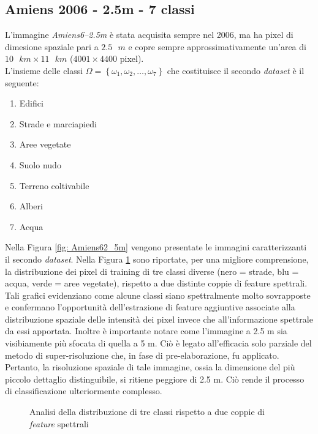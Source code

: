 \clearpage
\subsection{Amiens 2006 - 2.5m - 7 classi}
L'immagine \emph{Amiens6--2.5m} è stata acquisita sempre nel 2006, ma ha pixel di dimesione spaziale pari a $2.5\text{ }m$  e copre sempre approssimativamente un'area di $10\text{ }km\times11\text{ }km$ ($4001\times4400$ pixel).\\
L'insieme delle classi $\Omega=\left\lbrace\omega_1,\omega_2,\ldots,\omega_{7}\right\rbrace$ che costituisce il secondo \emph{dataset} è il seguente:
\begin{enumerate}
\item Edifici
\item Strade e marciapiedi
\item Aree vegetate
\item Suolo nudo
\item Terreno coltivabile
\item Alberi
\item Acqua
\end{enumerate}
Nella Figura \ref{fig: Amiens62_5m} vengono presentate le immagini caratterizzanti il secondo \emph{dataset}. Nella Figura \ref{fig:3classi} sono riportate, per una migliore comprensione, la distribuzione dei pixel di training di tre classi diverse (nero = strade, blu = acqua, verde = aree vegetate), rispetto a due distinte coppie di feature spettrali. Tali grafici evidenziano come alcune classi siano spettralmente molto sovrapposte e confermano l'opportunità dell'estrazione di feature aggiuntive associate alla distribuzione spaziale delle intensità dei pixel invece che all'informazione spettrale da essi apportata. Inoltre è importante notare come l'immagine a 2.5 m sia visibiamente più sfocata di quella a 5 m. Ciò è legato all'efficacia solo parziale del metodo di super-risoluzione che, in fase di pre-elaborazione, fu applicato. Pertanto, la risoluzione spaziale di tale immagine, ossia la dimensione del più piccolo dettaglio distinguibile, si ritiene peggiore di 2.5 m. Ciò rende il processo di classificazione ulteriormente complesso.

 \begin{figure}[!ht]
\center  
{}
      \hspace{3mm}
		
    \caption{Analisi della distribuzione di tre classi rispetto a due coppie di \emph{feature} spettrali}
    \label{fig:3classi}
  \end{figure}


